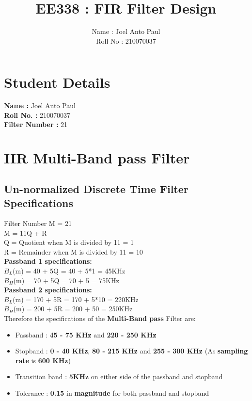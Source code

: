 \documentclass{article}
\title{EE338 : FIR Filter Design}
\author{Name : Joel Anto Paul \\ Roll No : 210070037 }
\date{}
\begin{document}
\maketitle


\section{\textbf{Student Details}}
\textbf{Name : }Joel Anto Paul\\
\textbf{Roll No. : }210070037\\
\textbf{Filter Number : }21

\section{\textbf{IIR Multi-Band pass Filter}}
\subsection{\textbf{Un-normalized Discrete Time Filter Specifications}}
Filter Number M = 21\\
M = 11Q + R\\
Q = Quotient when M is divided by 11 = 1\\
R = Remainder when M is divided by 11 = 10\\
\textbf{Passband 1 specifications:} \\
$B_L$(m) = 40 + 5Q = 40 + 5*1 = 45KHz \\
$B_H$(m) = 70 + 5Q = 70 + 5 = 75KHz\\
\textbf{Passband 2 specifications:}\\
$B_L$(m) = 170 + 5R = 170 + 5*10 = 220KHz \\
$B_H$(m) = 200 + 5R = 200 + 50 = 250KHz\\
\noindent
Therefore the specifications of the \textbf{Multi-Band pass} Filter are:
\begin{itemize}
    \item Passband : \textbf{45 - 75 KHz} and \textbf{220 - 250 KHz} 
    \item Stopband : \textbf{0 - 40 KHz}, \textbf{80 - 215 KHz} and \textbf{255 - 300 KHz} (As \textbf{sampling rate} is \textbf{600 KHz})
    \item  Transition band : \textbf{5KHz} on either side of the passband and stopband
    \item  Tolerance : \textbf{0.15} in \textbf{magnitude} for both passband and stopband
\end{itemize}
\end{document}
